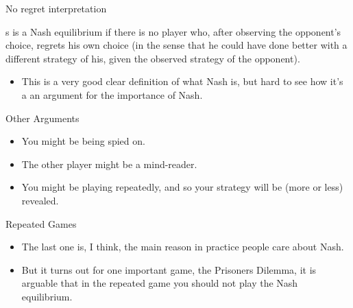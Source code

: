 \documentclass[
  14pt,
  letterpaper,
  ignorenonframetext,
  aspectratio=169,
  handout]{beamer}
\providecommand{\tightlist}{%
  \setlength{\itemsep}{0pt}\setlength{\parskip}{0pt}}\usepackage{longtable,booktabs,array}
\renewenvironment*{quote}	
	{\list{}{\rightmargin   \leftmargin} \item } 	
	{\endlist }
\let\olditem\item
\renewcommand{\item}{%
\olditem\vspace{6pt}}
\begin{document}
\begin{frame}{No regret interpretation}
\protect\hypertarget{no-regret-interpretation}{}
\begin{quote}
s is a Nash equilibrium if there is no player who, after observing the
opponent's choice, regrets his own choice (in the sense that he could
have done better with a different strategy of his, given the observed
strategy of the opponent).
\end{quote}

\begin{itemize}[<+->]
\tightlist
\item
  This is a very good clear definition of what Nash is, but hard to see
  how it's a an argument for the importance of Nash.
\end{itemize}
\end{frame}

\begin{frame}{Other Arguments}
\protect\hypertarget{other-arguments}{}
\begin{itemize}[<+->]
\tightlist
\item
  You might be being spied on.
\item
  The other player might be a mind-reader.
\item
  You might be playing repeatedly, and so your strategy will be (more or
  less) revealed.
\end{itemize}
\end{frame}

\begin{frame}{Repeated Games}
\protect\hypertarget{repeated-games}{}
\begin{itemize}[<+->]
\tightlist
\item
  The last one is, I think, the main reason in practice people care
  about Nash.
\item
  But it turns out for one important game, the Prisoners Dilemma, it is
  arguable that in the repeated game you should not play the Nash
  equilibrium.
\end{itemize}
\end{frame}
\end{document}
